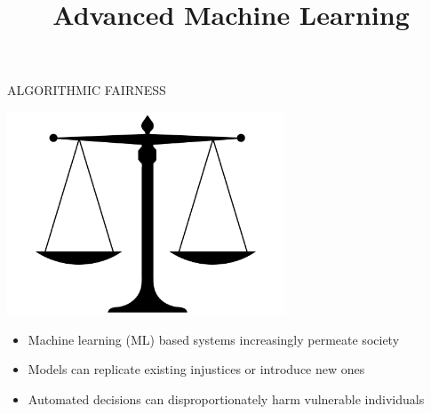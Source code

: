 \documentclass[11pt,compress,t,notes=noshow, xcolor=table]{beamer}
\title{Advanced Machine Learning}
\date{}
\begin{document}
\sloppy


\begin{vbframe}{ALGORITHMIC FAIRNESS}
    \begin{center}
        \vspace{-0.5cm}
        \includegraphics[width=0.62\textwidth]{figures/scale.png}
    \end{center}

    \begin{itemize}
        \item Machine learning (ML) based systems increasingly permeate society
        \item Models can replicate existing injustices or introduce new ones
        \item Automated decisions can disproportionately harm vulnerable individuals
    \end{itemize}
\end{vbframe}
\end{document}
